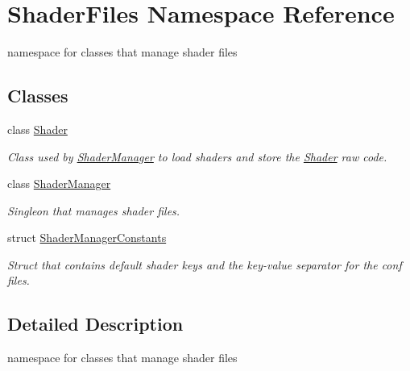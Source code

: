 \hypertarget{namespace_shader_files}{}\section{Shader\+Files Namespace Reference}
\label{namespace_shader_files}


namespace for classes that manage shader files  


\subsection*{Classes}
\begin{DoxyCompactItemize}
\item 
class \mbox{\hyperlink{class_shader_files_1_1_shader}{Shader}}
\begin{DoxyCompactList}\small\item\em Class used by \mbox{\hyperlink{class_shader_files_1_1_shader_manager}{Shader\+Manager}} to load shaders and store the \mbox{\hyperlink{class_shader_files_1_1_shader}{Shader}} raw code. \end{DoxyCompactList}\item 
class \mbox{\hyperlink{class_shader_files_1_1_shader_manager}{Shader\+Manager}}
\begin{DoxyCompactList}\small\item\em Singleon that manages shader files. \end{DoxyCompactList}\item 
struct \mbox{\hyperlink{struct_shader_files_1_1_shader_manager_constants}{Shader\+Manager\+Constants}}
\begin{DoxyCompactList}\small\item\em Struct that contains default shader keys and the key-\/value separator for the conf files. \end{DoxyCompactList}\end{DoxyCompactItemize}


\subsection{Detailed Description}
namespace for classes that manage shader files 